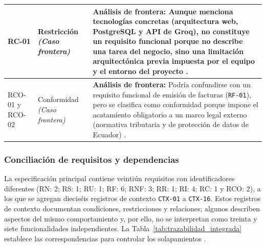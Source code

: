 \documentclass[onecolumn,12pt,a4paper]{IEEEtran}
\begin{document}
\begin{longtable}{>{\raggedright\arraybackslash}p{1.4cm} >{\raggedright\arraybackslash}p{2.4cm} >{\raggedright\arraybackslash}p{11.2cm}}
		\midrule
		RC-01 & Restricci\'on \textit{(Caso frontera)} & \textbf{An\'alisis de frontera:} Aunque menciona tecnolog\'ias concretas (arquitectura web, PostgreSQL y API de Groq), no constituye un requisito funcional porque no describe una tarea del negocio, sino una limitaci\'on arquitect\'onica previa impuesta por el equipo y el entorno del proyecto \cite{pohl2025,glinz2007}. \\
		\midrule
		RCO-01 y RCO-02 & Conformidad \textit{(Caso frontera)} & \textbf{An\'alisis de frontera:} Podr\'ia confundirse con un requisito funcional de emisi\'on de facturas (\texttt{RF-01}), pero se clasifica como conformidad porque impone el acatamiento obligatorio a un marco legal externo (normativa tributaria y de protecci\'on de datos de Ecuador) \cite{iso29148,swebok4}. \\
	\end{longtable}

\subsubsection*{Conciliaci\'on de requisitos y dependencias}
La especificaci\'on principal contiene veintiún requisitos con identificadores diferentes (RN: 2; RS: 1; RU: 1; RF: 6; RNF: 3; RR: 1; RI: 4; RC: 1 y RCO: 2), a los que se agregan diecis\'eis registros de contexto \texttt{CTX-01} a \texttt{CTX-16}. Estos registros de contexto documentan condiciones, restricciones y relaciones; algunos describen aspectos del mismo comportamiento y, por ello, no se interpretan como treinta y siete funcionalidades independientes. La Tabla~\ref{tab:trazabilidad_integrada} establece las correspondencias para controlar los solapamientos \cite{iso29148,pohl2025}.
\end{document}
